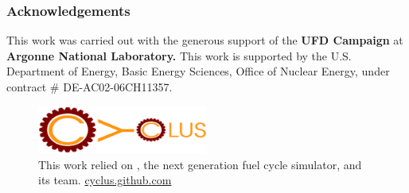 \begin{frame}
\frametitle{Acknowledgements}

This work was carried out with the generous support of the \textbf{UFD Campaign} 
at \textbf{Argonne National Laboratory.} This work is supported by
the U.S. Department of Energy, Basic Energy Sciences, Office of Nuclear Energy, 
under contract \# DE-AC02-06CH11357.
\vspace{\baselineskip}
\begin{figure}[htp!]
  \begin{center}
    \includegraphics[width=0.5\textwidth]{images/cycluslogo.eps}
  \end{center}
  \caption{This work relied on \Cyclus, the next generation fuel cycle 
    simulator, and its team. \url{cyclus.github.com}}
  \label{fig:ngfcspics}
\end{figure}

\end{frame}
